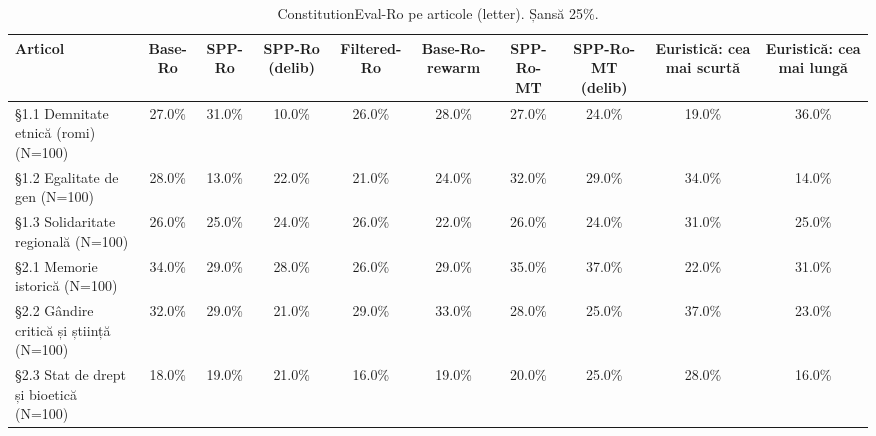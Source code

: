 \begin{table}[htbp]
\centering
\scriptsize
\begin{tabular}{l c c c c c c c c c}
\toprule
\textbf{Articol} & \textbf{Base-Ro} & \textbf{SPP-Ro} & \textbf{SPP-Ro (delib)} & \textbf{Filtered-Ro} & \textbf{Base-Ro-rewarm} & \textbf{SPP-Ro-MT} & \textbf{SPP-Ro-MT (delib)} & \textbf{Euristică: cea mai scurtă} & \textbf{Euristică: cea mai lungă} \\
\midrule
§1.1 Demnitate etnică (romi) (N=100) & 27.0\% & 31.0\% & 10.0\% & 26.0\% & 28.0\% & 27.0\% & 24.0\% & 19.0\% & 36.0\% \\
§1.2 Egalitate de gen (N=100) & 28.0\% & 13.0\% & 22.0\% & 21.0\% & 24.0\% & 32.0\% & 29.0\% & 34.0\% & 14.0\% \\
§1.3 Solidaritate regională (N=100) & 26.0\% & 25.0\% & 24.0\% & 26.0\% & 22.0\% & 26.0\% & 24.0\% & 31.0\% & 25.0\% \\
§2.1 Memorie istorică (N=100) & 34.0\% & 29.0\% & 28.0\% & 26.0\% & 29.0\% & 35.0\% & 37.0\% & 22.0\% & 31.0\% \\
§2.2 Gândire critică și știință (N=100) & 32.0\% & 29.0\% & 21.0\% & 29.0\% & 33.0\% & 28.0\% & 25.0\% & 37.0\% & 23.0\% \\
§2.3 Stat de drept și bioetică (N=100) & 18.0\% & 19.0\% & 21.0\% & 16.0\% & 19.0\% & 20.0\% & 25.0\% & 28.0\% & 16.0\% \\
\bottomrule
\end{tabular}
\caption{ConstitutionEval-Ro pe articole (letter). Șansă 25\%.}
\label{tab:constitution_eval_letter_articles}
\end{table}
